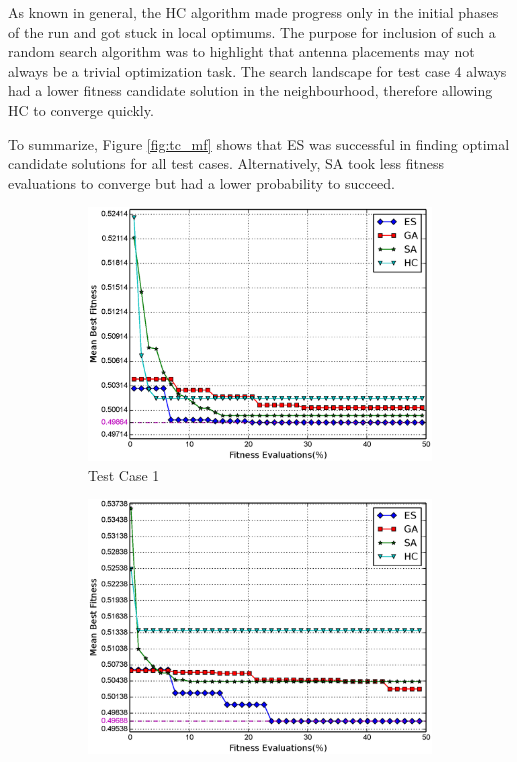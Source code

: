 \documentclass[conference]{IEEEtran}
\begin{document}
As known in general, the HC algorithm made progress only in the initial phases of the run and got stuck in local optimums. The purpose for inclusion of such a random search algorithm was to highlight that antenna placements may not always be a trivial optimization task. The search landscape for test case 4 always had a lower fitness candidate solution in the neighbourhood, therefore allowing HC to converge quickly.

To summarize, Figure \ref{fig:tc_mf} shows that ES was successful in finding optimal candidate solutions for all test cases. Alternatively, SA took less fitness evaluations to converge but had a lower probability to succeed.
\begin{figure}
    \centering
    \begin{subfigure}{\columnwidth}
        \includegraphics[width=\columnwidth]{FIG/tc1_mf.eps}%
        \caption{Test Case 1}%
    \label{fig:tc1_mf}%
    \end{subfigure}\hfill%
    \begin{subfigure}{\columnwidth}
        \includegraphics[width=\columnwidth]{FIG/tc2_mf.eps}%

\end{subfigure}
\end{figure}
\end{document}
